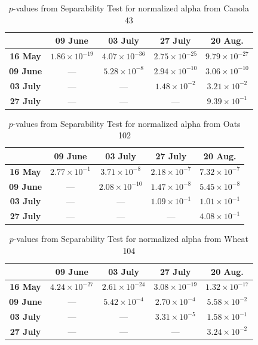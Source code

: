 \documentclass[journal]{IEEEtran}
\begin{document}
\begin{table}[hbt]
  \footnotesize
  \centering
  \caption{$p$-values from Separability Test for normalized alpha from Canola 43}
  \label{tab:pvalues_sep_alpha_cn43}
  \begin{tabular}{ccccc}
  \toprule
  & \textbf{09 June} & \textbf{03 July} & \textbf{27 July} & \textbf{20 Aug.}\\ \midrule
  \textbf{16 May}  & $1.86 \times 10^{-19}$ & $4.07 \times 10^{-36}$ & $2.75 \times 10^{-25}$ & $9.79 \times 10^{-27}$ \\
  \textbf{09 June}  & --- & $5.28 \times 10^{-8}$ & $2.94 \times 10^{-10}$ & $3.06 \times 10^{-10}$ \\
  \textbf{03 July}  & --- & --- & $1.48 \times 10^{-2}$ & $3.21 \times 10^{-2}$\\
  \textbf{27 July}  & --- & --- & --- & $9.39 \times 10^{-1}$ \\
  \bottomrule
  \end{tabular}
\end{table}

\begin{table}[hbt]
  \footnotesize
  \centering
  \caption{$p$-values from Separability Test for normalized alpha from Oats 102}
  \label{tab:pvalues_sep_alpha_ot102}
  \begin{tabular}{ccccc}
  \toprule
  & \textbf{09 June} & \textbf{03 July} & \textbf{27 July} & \textbf{20 Aug.}\\ \midrule
  \textbf{16 May}  & $2.77 \times 10^{-1}$ & $3.71 \times 10^{-8}$ & $2.18 \times 10^{-7}$ & $7.32 \times 10^{-7}$ \\
  \textbf{09 June}  & --- & $2.08 \times 10^{-10}$ & $1.47 \times 10^{-8}$ & $5.45 \times 10^{-8}$ \\
  \textbf{03 July}  & --- & --- & $1.09 \times 10^{-1}$ & $1.01 \times 10^{-1}$\\
  \textbf{27 July}  & --- & --- & --- & $4.08 \times 10^{-1}$ \\
  \bottomrule
  \end{tabular}
\end{table}

\begin{table}[hbt]
  \footnotesize
  \centering
  \caption{$p$-values from Separability Test for normalized alpha from Wheat 104}
  \label{tab:pvalues_sep_alpha_wt104}
  \begin{tabular}{ccccc}
  \toprule
  & \textbf{09 June} & \textbf{03 July} & \textbf{27 July} & \textbf{20 Aug.}\\ \midrule
  \textbf{16 May}  & $4.24 \times 10^{-27}$ & $2.61 \times 10^{-24}$ & $3.08 \times 10^{-19}$ & $1.32 \times 10^{-17}$ \\
  \textbf{09 June}  & --- & $5.42 \times 10^{-4}$ & $2.70 \times 10^{-4}$ & $5.58 \times 10^{-2}$ \\
  \textbf{03 July}  & --- & --- & $3.31 \times 10^{-5}$ & $1.58 \times 10^{-1}$\\
  \textbf{27 July}  & --- & --- & --- & $3.24 \times 10^{-2}$ \\
  \bottomrule
  \end{tabular}
\end{table}
\end{document}

